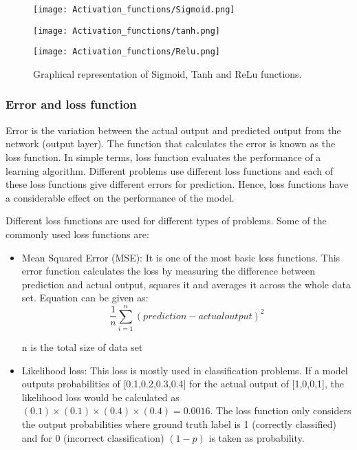 \begin{figure}[h!]

\begin{multicols}{2}
    \texttt{[image: Activation\_functions/Sigmoid.png]}\par \texttt{[image: Activation\_functions/tanh.png]}\par
    \end{multicols}
\begin{center}
\texttt{[image: Activation\_functions/Relu.png]}\par
    
\end{center}
\caption{Graphical representation of Sigmoid, Tanh and ReLu functions. 
\cite{locv}}
\label{nl_activations}
\end{figure}


\subsubsection{Error and loss function}

Error is the variation between the actual output and predicted output from the network (output layer). The function that calculates the error is known as the loss function. In simple terms, loss function evaluates the performance of a learning algorithm. Different problems use different loss functions and each of these loss functions give different errors for prediction. Hence, loss functions have a considerable effect on the performance of the model.

\par

Different loss functions are used for different types of problems. Some of the commonly used loss functions are: 

\begin{itemize}
    
    \item Mean Squared Error (MSE): It is one of the most basic loss functions. This error function calculates the loss by measuring the difference between prediction and actual output, squares it and averages it across the whole data set.
    \newline Equation can be given as:
    \begin{equation}
        \dfrac{1}{n}\sum_{i=1}^{n}(prediction - actual output)^2
    \end{equation}
    \par n is the total size of data set

    \item Likelihood loss: This loss is mostly used in classification problems. If a model outputs probabilities of [0.1,0.2,0.3,0.4] for the actual output of [1,0,0,1], the likelihood loss would be calculated as $(0.1)\times(0.1)\times(0.4)\times(0.4)= 0.0016$. The loss function only considers the output probabilities where ground truth label is 1 (correctly classified) and for 0 (incorrect classification) $(1-p)$ is taken as probability.

\end{itemize}

